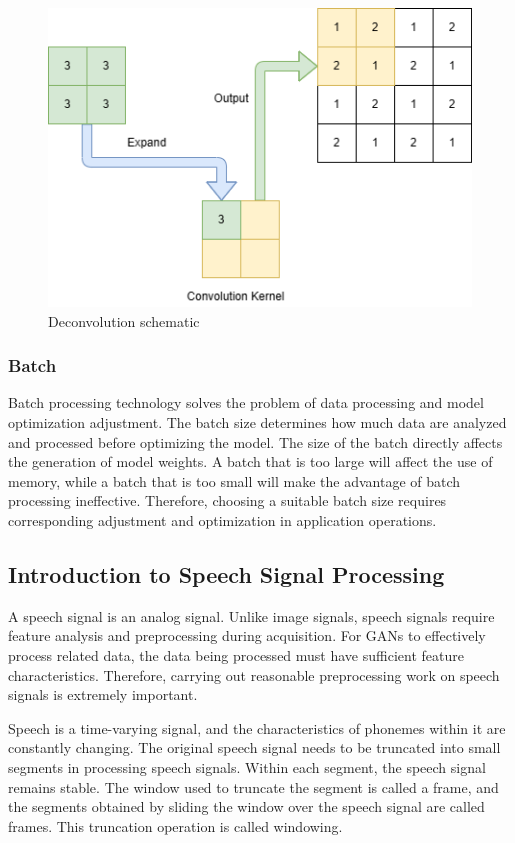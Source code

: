 \documentclass[10pt,journal,compsoc]{IEEEtran}
\begin{document}
\begin{enumerate}
\begin{figure}
    \centering
    \includegraphics[scale=0.5] {PNG/2-12.png}
    \caption{Deconvolution schematic}
    \label{fig:2-12}
\end{figure}

\end{enumerate}

\subsubsection{Batch}

Batch processing technology solves the problem of data processing and model optimization adjustment. The batch size determines how much data are analyzed and processed before optimizing the model. The size of the batch directly affects the generation of model weights. A batch that is too large will affect the use of memory, while a batch that is too small will make the advantage of batch processing ineffective. Therefore, choosing a suitable batch size requires corresponding adjustment and optimization in application operations.

\subsection{Introduction to Speech Signal Processing}

A speech signal is an analog signal. Unlike image signals, speech signals require feature analysis and preprocessing during acquisition. For GANs to effectively process related data, the data being processed must have sufficient feature characteristics. Therefore, carrying out reasonable preprocessing work on speech signals is extremely important.

Speech is a time-varying signal, and the characteristics of phonemes within it are constantly changing. The original speech signal needs to be truncated into small segments in processing speech signals. Within each segment, the speech signal remains stable. The window used to truncate the segment is called a frame, and the segments obtained by sliding the window over the speech signal are called frames. This truncation operation is called windowing.
\end{document}
